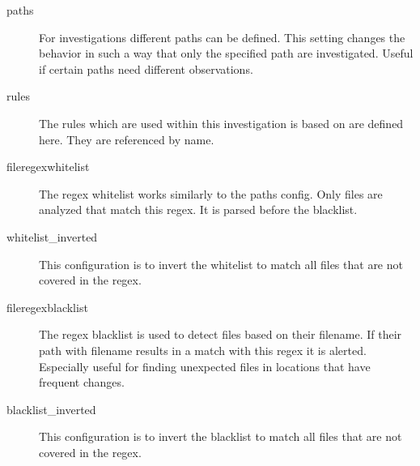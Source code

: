 \begin{description}
    \item [paths] For investigations different paths can be defined. This setting changes the behavior in such a way that only the specified path are investigated. Useful if certain paths need different observations.
    \item [rules] The rules which are used within this investigation is based on are defined here. They are referenced by name.
    \item [fileregexwhitelist] The \gls{regex} whitelist works similarly to the paths config. Only files are analyzed that match this \gls{regex}. It is parsed before the blacklist.
    \item [whitelist\_inverted] This configuration is to invert the whitelist to match all files that are not covered in the \gls{regex}.
    \item [fileregexblacklist] The \gls{regex} blacklist is used to detect files based on their filename. If their path with filename results in a match with this \gls{regex} it is alerted. Especially useful for finding unexpected files in locations that have frequent changes.
    \item [blacklist\_inverted] This configuration is to invert the blacklist to match all files that are not covered in the \gls{regex}.
\end{description}